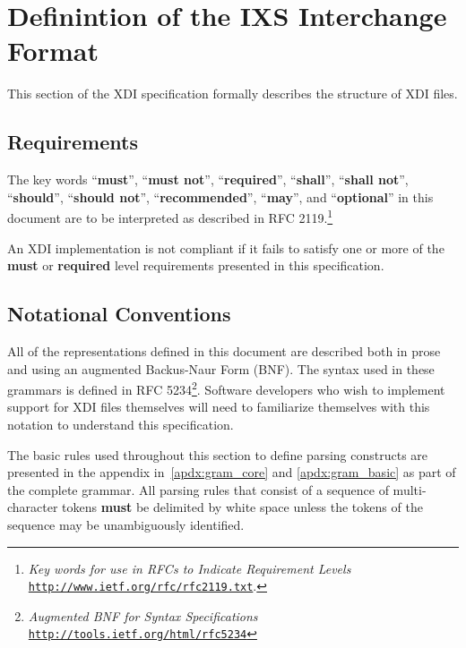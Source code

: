 \documentclass{article}
\newcommand{\xdi}{\textsf{XDI}}
\begin{document}
\section{Definintion of the IXS Interchange Format}
\label{sec:def_ixsif}

This section of the {\xdi} specification formally describes the
structure of {\xdi} files.

\subsection{Requirements}
\label{sec:def_requirements}

The key words ``\textbf{must}'', ``\textbf{must not}'',
``\textbf{required}'', ``\textbf{shall}'', ``\textbf{shall not}'',
``\textbf{should}'', ``\textbf{should not}'',
``\textbf{recommended}'', ``\textbf{may}'', and ``\textbf{optional}''
in this document are to be interpreted as described in RFC
2119.\footnote{\textit{Key words for use in RFCs to Indicate
    Requirement Levels} \href{http://www.ietf.org/rfc/rfc2119.txt}
  {\texttt{http://www.ietf.org/rfc/rfc2119.txt}}.}

An {\xdi} implementation is not compliant if it fails to satisfy
one or more of the \textbf{must} or \textbf{required} level
requirements presented in this specification.

\subsection{Notational Conventions}
\label{sec:def_notation}

All of the representations defined in this document are described both
in prose and using an augmented Backus-Naur Form (BNF).  The syntax
used in these grammars is defined in RFC
5234\footnote{\textit{Augmented BNF for Syntax Specifications}
  \href{http://tools.ietf.org/html/rfc5234}
  {\texttt{http://tools.ietf.org/html/rfc5234}}}.
Software developers who wish to implement support for {\xdi} files
themselves will need to familiarize themselves with this notation to
understand this specification.

The basic rules used throughout this section to define parsing
constructs are presented in the appendix in~\ref{apdx:gram_core} and
\ref{apdx:gram_basic} as part of the complete grammar. All parsing
rules that consist of a sequence of multi-character tokens
\textbf{must} be delimited by white space unless the tokens of the
sequence may be unambiguously identified.
\end{document}
